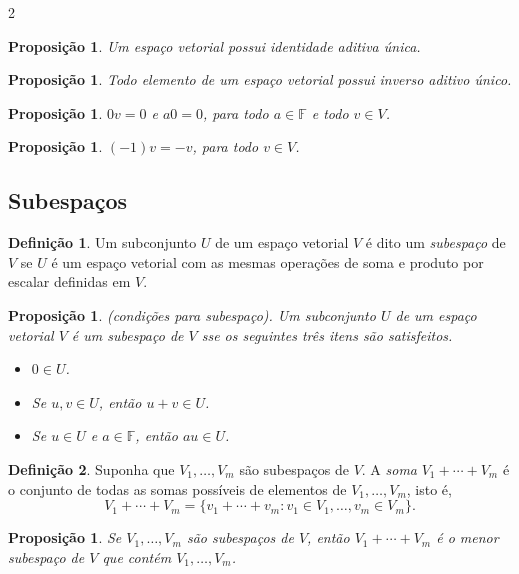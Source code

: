 \documentclass{article}
\theoremstyle{plain}
\newtheorem{prop}[thm]{Proposição}
\theoremstyle{definition}
\newtheorem{defn}{Definição}[section]
\theoremstyle{remark}
\begin{document}
\begin{multicols}{2}
\begin{prop}
    Um espaço vetorial possui identidade aditiva única.
\end{prop}

\begin{prop}
    Todo elemento de um espaço vetorial possui inverso aditivo único.
\end{prop}

\begin{prop}
    \(0v = 0\) e \(a0 = 0\), para todo \(a \in \mathbb{F}\) e todo \(v \in V\).
\end{prop}

\begin{prop}
    \((-1)v = -v\), para todo \(v \in V\).
\end{prop}

\subsection{Subespaços}
\begin{defn}
    Um subconjunto \(U\) de um espaço vetorial \(V\) é dito um \emph{subespaço} de \(V\) se \(U\) é um espaço vetorial com as mesmas operações de soma e produto por escalar definidas em \(V\).
\end{defn}

\begin{prop} (condições para subespaço).
    Um subconjunto \(U\) de um espaço vetorial \(V\) é um subespaço de \(V\) sse os seguintes três itens são satisfeitos.
    \begin{itemize}
        \item \(0 \in U\).
        \item Se \(u, v \in U\), então \(u + v \in U\).
        \item Se \(u \in U\) e \(a \in \mathbb{F}\), então \(au \in U\).
    \end{itemize}
\end{prop}

\begin{defn}
    Suponha que \(V_1,\ldots,V_m\) são subespaços de \(V\). A \emph{soma} \(V_1 + \cdots + V_m\) é o conjunto de todas as somas possíveis de elementos de \(V_1, \ldots, V_m\), isto é,
    \[
        V_1 + \cdots + V_m = \{v_1 + \cdots + v_m : v_1 \in V_1, \ldots, v_m \in V_m\}.
    \]
\end{defn}

\begin{prop}
    Se \(V_1, \ldots, V_m\) são subespaços de \(V\), então \(V_1 + \cdots + V_m\) é o menor subespaço de \(V\) que contém \(V_1, \ldots, V_m\).
\end{prop}


\end{multicols}
\end{document}
